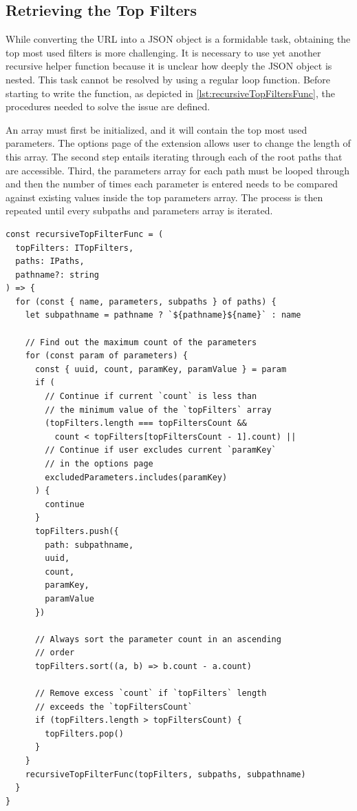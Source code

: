 \subsection*{Retrieving the Top Filters}
While converting the URL into a JSON object is a formidable task, obtaining the top most used filters is more challenging. It is necessary to use yet another recursive helper function because it is unclear how deeply the JSON object is nested. This task cannot be resolved by using a regular loop function. Before starting to write the function, as depicted in \autoref{lst:recursiveTopFiltersFunc}, the procedures needed to solve the issue are defined.

An array must first be initialized, and it will contain the top most used parameters. The options page of the extension allows user to change the length of this array. The second step entails iterating through each of the root paths that are accessible. Third, the parameters array for each path must be looped through and then the number of times each parameter is entered needs to be compared against existing values inside the top parameters array. The process is then repeated until every subpaths and parameters array is iterated.

\begin{lstlisting}[style=ES6, caption={Recursive function to get the top filters (TypeScript)}, label={lst:recursiveTopFiltersFunc}]
const recursiveTopFilterFunc = (
  topFilters: ITopFilters,
  paths: IPaths,
  pathname?: string
) => {
  for (const { name, parameters, subpaths } of paths) {
    let subpathname = pathname ? `${pathname}${name}` : name

    // Find out the maximum count of the parameters
    for (const param of parameters) {
      const { uuid, count, paramKey, paramValue } = param
      if (
        // Continue if current `count` is less than
        // the minimum value of the `topFilters` array
        (topFilters.length === topFiltersCount &&
          count < topFilters[topFiltersCount - 1].count) ||
        // Continue if user excludes current `paramKey`
        // in the options page
        excludedParameters.includes(paramKey)
      ) {
        continue
      }
      topFilters.push({
        path: subpathname,
        uuid,
        count,
        paramKey,
        paramValue
      })

      // Always sort the parameter count in an ascending
      // order
      topFilters.sort((a, b) => b.count - a.count)

      // Remove excess `count` if `topFilters` length
      // exceeds the `topFiltersCount`
      if (topFilters.length > topFiltersCount) {
        topFilters.pop()
      }
    }
    recursiveTopFilterFunc(topFilters, subpaths, subpathname)
  }
}
\end{lstlisting}
